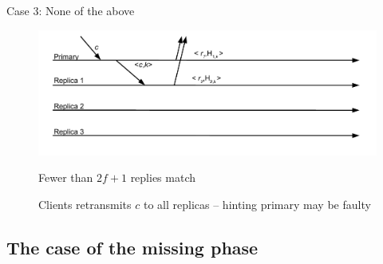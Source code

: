 \begin{frame}{Case 3: None of the above}

\begin{figure}
	\includegraphics[width=\textwidth]{messages11}	
	
\BIL
\item Fewer than $2f+1$ replies match
\item Clients retransmits $c$ to all replicas -- hinting primary may be faulty
\EIL	
	
\end{figure}

\end{frame}

\subsection{The case of the missing phase}

